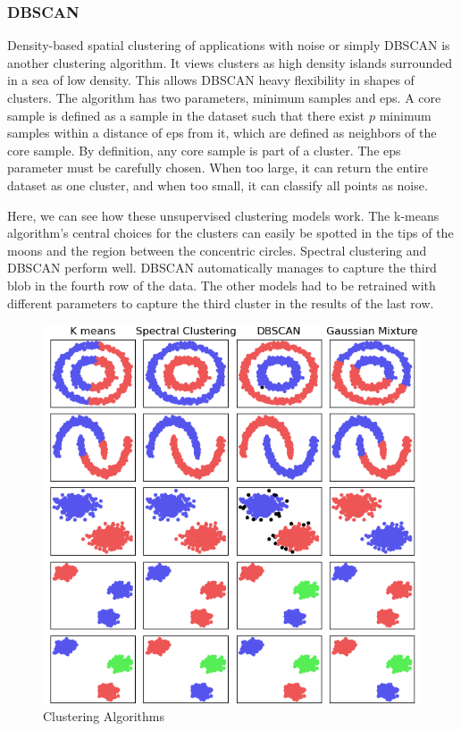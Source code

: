 \documentclass{article}
\begin{document}
\subsubsection{DBSCAN}
Density-based spatial clustering of applications with noise or simply DBSCAN is another clustering algorithm. It views clusters as high density islands surrounded in a sea of low density. This allows DBSCAN heavy flexibility in shapes of clusters. The algorithm has two parameters, minimum samples and eps.  A core sample is defined as a sample in the dataset such that there exist $p$ minimum samples within a distance of eps from it, which are defined as neighbors of the core sample. By definition, any core sample is part of a cluster. The eps parameter must be carefully chosen. When too large, it can return the entire dataset as one cluster, and when too small, it can classify all points as noise.

Here, we can see how these unsupervised clustering models work. The k-means algorithm's central choices for the clusters can easily be spotted in the tips of the moons and the region between the concentric circles. Spectral clustering and DBSCAN perform well. DBSCAN automatically manages to capture the third blob in the fourth row of the data. The other models had to be retrained with different parameters to capture the third cluster in the results of the last row.

\begin{figure}[H]
\includegraphics[width=0.9\linewidth]{Images/cluster.png}
\centering
\caption{Clustering Algorithms}
\end{figure}
\end{document}
